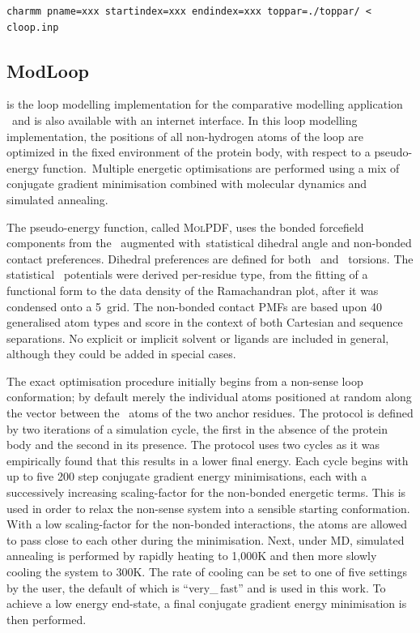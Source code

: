 \begin{lstlisting}[float, caption={The command line used by the modified \cloop\ script.}, label=listing:methcomp:cloop]
charmm pname=xxx startindex=xxx endindex=xxx toppar=./toppar/ < cloop.inp
\end{lstlisting}


\subsection{ModLoop}

\modloop\cite{METHOD:Modloop} is the loop modelling implementation for the comparative modelling application \modeller\ and is also available with an internet interface\cite{METHOD:Modloop_WEB}. In this loop modelling implementation,
the positions of all non-hydrogen atoms of the loop are optimized in the fixed environment of the protein body, with respect to a
pseudo-energy function.\ Multiple energetic optimisations are performed using a mix of conjugate
gradient minimisation combined with molecular dynamics and simulated annealing.
 
The pseudo-energy function, called  \textsc{MolPDF}, uses the bonded forcefield components from the
 \forcefield\ augmented with\ statistical
dihedral angle and non-bonded contact preferences. Dihedral preferences are defined for both \mainchain\ and \sidechain\  torsions. The statistical \phipsi\ potentials were derived per-residue type, from the fitting of a functional
form to the data density of the Ramachandran plot, after it was condensed
onto a 5\degree\ grid.
The non-bonded
contact PMFs are based upon 40 generalised atom types and score in the context of both Cartesian and sequence separations. 
No explicit or implicit solvent or
ligands are included in general, although they could be added in
special cases.

The exact optimisation procedure initially begins from a non-sense  loop conformation; by default merely the individual atoms 
positioned at random
along the vector between the \ca\ atoms of the two anchor residues.
The protocol is defined by two iterations of a simulation cycle, the first
in the absence of the protein body and the second in its presence. The protocol uses two cycles
as it was empirically found that this results in a lower final
energy. Each cycle
begins with up to five 200 step conjugate gradient energy minimisations, each with a successively increasing scaling-factor for the non-bonded energetic terms. This is used in order to relax the non-sense system into a sensible starting conformation. With a low scaling-factor for the non-bonded interactions, the atoms are allowed to pass close to
each other during the minimisation. Next, under MD, simulated annealing is
performed by rapidly heating to 1,000K and then more slowly cooling the system
to 300K. The rate of cooling can be set to one of five settings by the user, the default of which is ``very\_\,fast'' and is used in this work. To achieve a  low
energy end-state, a final conjugate gradient energy minimisation is then performed.

